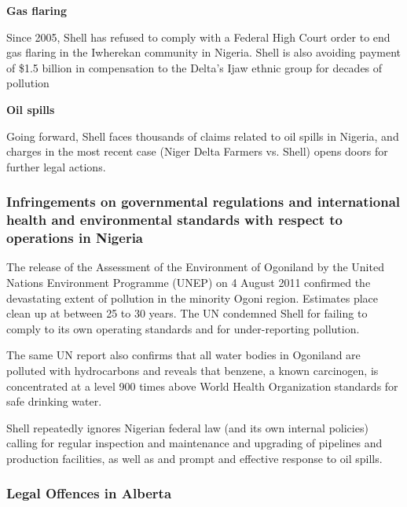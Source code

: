 \textbf{Gas flaring}

Since 2005, Shell has refused to comply with a Federal High Court order to end gas flaring in the Iwherekan community in Nigeria. Shell is also avoiding payment of \$1.5 billion in compensation to the Delta’s Ijaw ethnic group for decades of pollution

\textbf{Oil spills}

Going forward, Shell faces thousands of claims related to oil spills in Nigeria, and charges in the most recent case (Niger Delta Farmers vs. Shell) opens doors for further legal actions.



	\subsubsection{Infringements on governmental regulations and international health and   
	          environmental standards with respect to operations in Nigeria}
	
	
	
The release of the Assessment of the Environment of Ogoniland by the United Nations Environment Programme (UNEP) on 4 August 2011 confirmed the devastating extent of pollution in the minority Ogoni region. Estimates place clean up at between 25 to 30 years. The UN condemned Shell for failing to comply to its own operating standards and for under-reporting pollution.



The same UN report also confirms that all water bodies in Ogoniland are polluted with hydrocarbons and reveals that benzene, a known carcinogen, is concentrated at a level 900 times above World Health Organization standards for safe drinking water.



Shell repeatedly ignores Nigerian federal law (and its own internal policies) calling for regular inspection and maintenance and upgrading of pipelines and production facilities, as well as and prompt and effective response to oil spills.  





	\subsubsection{Legal Offences in Alberta}
	




